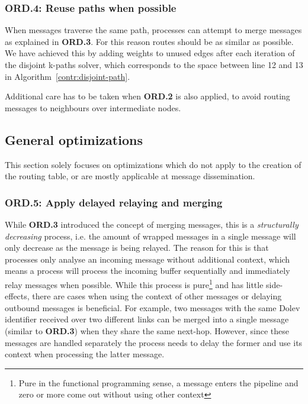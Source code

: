 \subsubsection{ORD.4: Reuse paths when possible}
When messages traverse the same path, processes can attempt to merge messages as explained in \textbf{ORD.3}. For this reason routes should be as similar as possible. We have achieved this  by adding weights to unused edges after each iteration of the disjoint k-paths solver, which corresponds to the space between line 12 and 13 in Algorithm~\ref{contr:disjoint-path}. 

Additional care has to be taken when \textbf{ORD.2} is also applied, to avoid routing messages to neighbours over intermediate nodes.

\subsection{General optimizations}
This section solely focuses on optimizations which do not apply to the creation of the routing table, or are mostly applicable at message dissemination.

\subsubsection{ORD.5: Apply delayed relaying and merging}
While \textbf{ORD.3} introduced the concept of merging messages, this is a \textit{structurally decreasing} process, i.e. the amount of wrapped messages in a single message will only decrease as the message is being relayed. The reason for this is that processes only analyse an incoming message without additional context, which means a process will process the incoming buffer sequentially and immediately relay messages when possible.
While this process is pure\footnote{Pure in the functional programming sense, a message enters the pipeline and zero or more come out without using other context} 
and has little side-effects, there are cases when using the context of other messages or delaying outbound messages is beneficial. For example, two messages with the same Dolev identifier received over two different links can be merged into a single message (similar to \textbf{ORD.3}) when they share the same next-hop. However, since these messages are handled separately the process needs to delay the former and use its context when processing the latter message.

